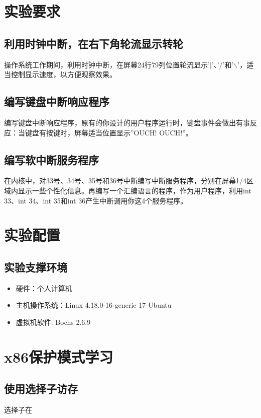 \documentclass[a4paper,11pt,UTF8]{ctexart}
\begin{document}
\section{实验要求}

	\subsection{利用时钟中断，在右下角轮流显示转轮}

	操作系统工作期间，利用时钟中断，在屏幕24行79列位置轮流显示’|’、’/’和'$\backslash$'，适当控制显示速度，以方便观察效果。

	\subsection{编写键盘中断响应程序}
	编写键盘中断响应程序，原有的你设计的用户程序运行时，键盘事件会做出有事反应：当键盘有按键时，屏幕适当位置显示”OUCH! OUCH!”。
	\subsection{编写软中断服务程序}
	在内核中，对33号、34号、35号和36号中断编写中断服务程序，分别在屏幕1/4区域内显示一些个性化信息。再编写一个汇编语言的程序，作为用户程序，利用int 33、int 34、int 35和int 36产生中断调用你这4个服务程序。

\section{实验配置}

	\subsection{实验支撑环境}
		\begin{itemize} 
			\item 硬件：个人计算机
			\item 主机操作系统：Linux 4.18.0-16-generic 17-Ubuntu
			\item 虚拟机软件: Bochs 2.6.9
		\end{itemize}
	
	
	 
\section{x86保护模式学习}
	\subsection{使用选择子访存}
	选择子在
\end{document}
